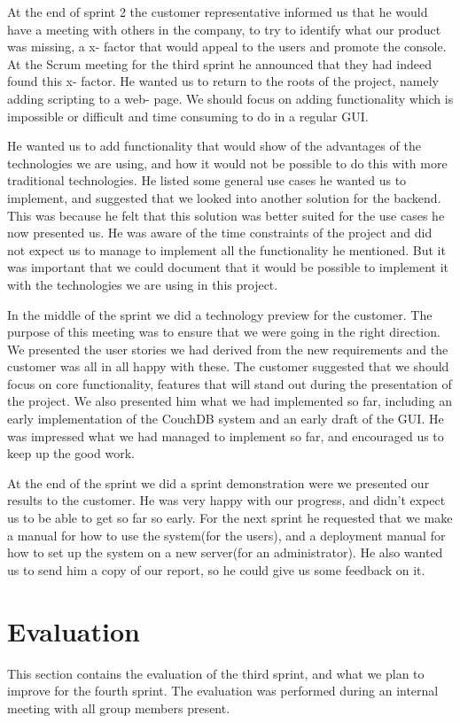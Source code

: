 At the end of sprint 2 the customer representative informed us that he would have a meeting with others in the company, to try to identify what our product was missing, a x- factor that would appeal to the users and promote the console. At the Scrum meeting for the third sprint he announced that they had indeed found this x- factor. He wanted us to return to the roots of the project, namely adding scripting to a web- page. We should focus on adding functionality which is impossible or difficult and time consuming to do in a regular GUI.


He wanted us to add functionality that would show of the advantages of the technologies we are using, and how it would not be possible to do this with more traditional technologies. He listed some general use cases he wanted us to implement, and suggested that we looked into another solution for the backend. This was because he felt that this solution was better suited for the use cases he now presented us. He was aware of the time constraints of the project and did not expect us to manage to implement all the functionality he mentioned. But it was important that we could document that it would be possible to implement it with the technologies we are using in this project.


In the middle of the sprint we did a technology preview for the customer. The purpose of this meeting was to ensure that we were going in the right direction. We presented the user stories we had derived from the new requirements and the customer was all in all happy with these. The customer suggested that we should focus on core functionality, features that will stand out during the presentation of the project. We also presented him what we had implemented so far, including an early implementation of the CouchDB system and an early draft of the GUI. He was impressed what we had managed to implement so far, and encouraged us to keep up the good work.


At the end of the sprint we did a sprint demonstration were we presented our results to the customer. He was very happy with our progress, and didn't expect us to be able to get so far so early. For the next sprint he requested that we make a manual for how to use the system(for the users), and a deployment manual for how to set up the system on a new server(for an administrator). He also wanted us to send him a copy of our report, so he could give us some feedback on it.

\section{Evaluation}
This section contains the evaluation of the third sprint, and what we plan to improve for the fourth sprint. The evaluation was performed during an internal meeting with all group members present.

